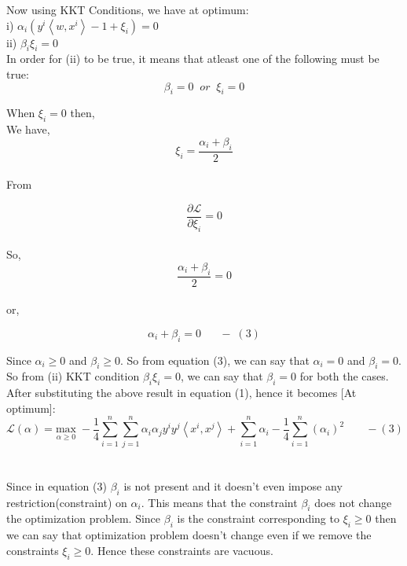 \documentclass[a4paper,11pt]{article}
\begin{document}
\begin{mlsolution}
Now using KKT Conditions, we have at optimum: \\

i) $\alpha_{i} \left ( y^{i} \left \langle w, x^{i} \right \rangle - 1 + \xi_{i} \right ) = 0$\\

ii) $\beta_{i} \xi_{i} = 0$\\

In order for (ii) to be true, it means that atleast one of the following must be true:
\[
\beta_{i} = 0 \;\;or\;\; \xi_{i}=0
\]

When $\xi_{i} = 0$ then,\\ 

We have,
\[
\xi_{i} = \frac{\alpha_{i} + \beta_{i}}{2}
\]\\

From

\[
\frac{\partial  \mathcal{L}}{\partial \xi_{i} } = 0
\]\\

So,
\[
    \frac{\alpha_{i} + \beta_{i}}{2} = 0  
\]\\
or,

\[
    \alpha_{i} + \beta_{i} = 0  \;\;\;\;\;\;-\;(3) 
\]

Since $\alpha_{i} \geq 0$ and $\beta_{i} \geq 0$. So from equation (3), we can say that  $\alpha_{i} = 0$ and $\beta_{i} = 0$.\\

So from (ii) KKT condition $\beta_{i} \xi_{i} = 0$, we can say that $\beta_{i} = 0$ for both the cases.\\


After substituting the above result in equation (1), hence it becomes [At optimum]:\\

\[
  \mathcal{L}\left ( \alpha \right ) = \underset{\alpha\geq 0}{\text{max}} \; -\frac{1}{4}\sum_{i=1}^{n}\sum_{j=1}^{n}\alpha_{i}\alpha_{j}y^{i}y^{j}\left \langle x^{i}, x^{j} \right \rangle + \sum_{i=1}^{n}\alpha_{i} - \frac{1}{4}\sum_{i=1}^{n} \left ( \alpha_{i} \right )^{2}\;\;\;\;\;\;\; - (3)
\]\\\\Since in equation (3) $\beta_{i}$ is not present and it doesn't even impose any restriction(constraint) on $\alpha_{i}$. This means that the constraint $\beta_{i}$ does not change the optimization problem. Since $\beta_{i}$ is the constraint corresponding to $\xi_{i} \geq 0$ then we can say that optimization problem doesn't change even if we remove the constraints $\xi_{i} \geq 0$. Hence these constraints are vacuous.\\\\


\end{mlsolution}
\end{document}
